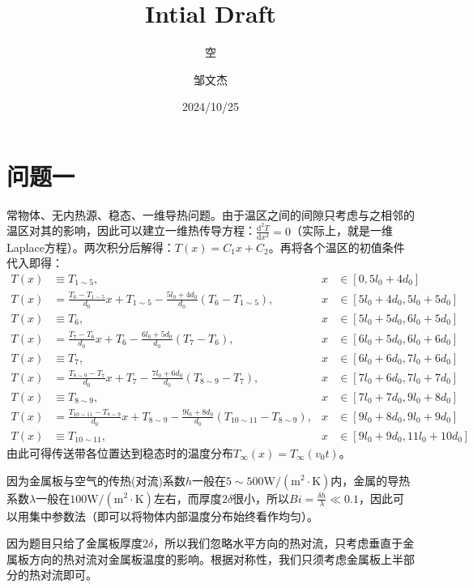 \documentclass[lang=cn,newtx,10pt,scheme=chinese]{../../Template/elegantbook}
\title{Intial Draft}
\subtitle{空}
\author{邹文杰}
\institute{无}
\date{2024/10/25}
\begin{document}
\maketitle

\frontmatter

\tableofcontents

\mainmatter

\chapter{问题一}

常物体、无内热源、稳态、一维导热问题。由于温区之间的间隙只考虑与之相邻的温区对其的影响，因此可以建立一维热传导方程：$\frac{\mathrm{d}^2T}{\mathrm{d}x^2}=0$（实际上，就是一维Laplace方程）。两次积分后解得：$T(x)=C_1x+C_2$。再将各个温区的初值条件代入即得：
\begin{align*}
T(x) &\equiv T_{1\sim 5}, &x &\in [0,5l_0 + 4d_0]\\
T(x) &= \frac{T_6 - T_{1\sim 5}}{d_0}x + T_{1\sim 5} - \frac{5l_0 + 4d_0}{d_0}(T_6 - T_{1\sim 5}), &x &\in [5l_0 + 4d_0,5l_0 + 5d_0]\\
T(x) &\equiv T_6, &x &\in [5l_0 + 5d_0,6l_0 + 5d_0]\\
T(x) &= \frac{T_7 - T_6}{d_0}x + T_6 - \frac{6l_0 + 5d_0}{d_0}(T_7 - T_6), &x &\in [6l_0 + 5d_0,6l_0 + 6d_0]\\
T(x) &\equiv T_7, &x &\in [6l_0 + 6d_0,7l_0 + 6d_0]\\
T(x) &= \frac{T_{8\sim 9} - T_7}{d_0}x + T_7 - \frac{7l_0 + 6d_0}{d_0}(T_{8\sim 9} - T_7), &x &\in [7l_0 + 6d_0,7l_0 + 7d_0]\\
T(x) &\equiv T_{8\sim 9}, &x &\in [7l_0 + 7d_0,9l_0 + 8d_0]\\
T(x) &= \frac{T_{10\sim 11} - T_{8\sim 9}}{d_0}x + T_{8\sim 9} - \frac{9l_0 + 8d_0}{d_0}(T_{10\sim 11} - T_{8\sim 9}), &x &\in [9l_0 + 8d_0,9l_0 + 9d_0]\\
T(x) &\equiv T_{10\sim 11}, &x &\in [9l_0 + 9d_0,11l_0 + 10d_0]
\end{align*}
由此可得传送带各位置达到稳态时的温度分布$T_{\infty}(x)=T_{\infty}(v_0t)$。

因为金属板与空气的传热(对流)系数$h$一般在$5\sim 500\mathrm{W}/(\mathrm{m}^2\cdot\mathrm{K})$内，金属的导热系数$\lambda$一般在$100\mathrm{W}/(\mathrm{m}^2\cdot\mathrm{K})$左右，而厚度$2\delta$很小，所以$Bi=\frac{\delta h}{\lambda}\ll 0.1$，因此可以用集中参数法（即可以将物体内部温度分布始终看作均匀）。

因为题目只给了金属板厚度$2\delta$，所以我们忽略水平方向的热对流，只考虑垂直于金属板方向的热对流对金属板温度的影响。根据对称性，我们只须考虑金属板上半部分的热对流即可。
\end{document}
